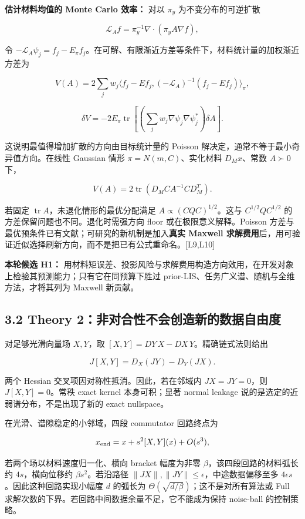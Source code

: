 \documentclass[
  11pt,
  a4paper,
]{article}
\begin{document}
\textbf{估计材料均值的 Monte Carlo 效率：} 对以 \(\pi_y\)
为不变分布的可逆扩散

\[\mathcal{L}_A f=\pi_y^{-1}\nabla\cdot(\pi_y A\nabla f),\]

令
\(-\mathcal{L}_A\psi_j=f_j-E_\pi f_j\)。在可解、有限渐近方差等条件下，材料统计量的加权渐近方差为

\[V(A)=2\sum_j w_j\langle f_j-Ef_j,(-\mathcal{L}_A)^{-1}(f_j-Ef_j)\rangle_\pi,\]

\[\delta V=-2E_\pi\operatorname{tr}\left[\left(\sum_jw_j\nabla\psi_j\nabla\psi_j^*\right)\delta A\right].\]

这说明最值得增加扩散的方向由目标统计量的 Poisson
解决定，通常不等于最小奇异值方向。在线性 Gaussian 情形
\(\pi=N(m,C)\)、实化材料 \(D_Mx\)、常数 \(A\succ0\) 下，

\[V(A)=2\operatorname{tr}(D_MCA^{-1}CD_M^T).\]

若固定 \(\operatorname{tr}A\)，未退化情形的最优分配满足
\(A\propto(CQC)^{1/2}\)。这与 \(C^{1/2}QC^{1/2}\)
的方差保留问题也不同。退化时需强方向 floor 或在极限意义解释。Poisson
方差与最优预条件已有文献；可研究的新机制是加入\textbf{真实 Maxwell
求解费用}后，用可验证近似选择刷新方向，而不是把已有公式重命名。{[}L9,L10{]}

\textbf{本轮候选 H1：}
用材料矩误差、投影风险与求解费用构造方向效用，在开发对象上检验其预测能力；只有它在同预算下胜过
prior-LIS、任务广义谱、随机与全维方法，才将其列为 Maxwell 新贡献。

\hypertarget{theory-2ux975eux5bf9ux5408ux6027ux4e0dux4f1aux521bux9020ux65b0ux7684ux6570ux636eux81eaux7531ux5ea6}{%
\subsection{3.2 Theory
2：非对合性不会创造新的数据自由度}\label{theory-2ux975eux5bf9ux5408ux6027ux4e0dux4f1aux521bux9020ux65b0ux7684ux6570ux636eux81eaux7531ux5ea6}}

对足够光滑向量场 \(X,Y\)，取 \([X,Y]=DY\,X-DX\,Y\)。精确链式法则给出

\[J[X,Y]=D_X(JY)-D_Y(JX).\]

两个 Hessian 交叉项因对称性抵消。因此，若在邻域内 \(JX=JY=0\)，则
\(J[X,Y]=0\)。常秩 exact kernel 本身可积；显著 normal leakage
说的是选定的近弱谱分布，不是出现了新的 exact nullspace。

在光滑、谱隙稳定的小邻域，四段 commutator 回路终点为

\[x_{\rm end}=x+s^2[X,Y](x)+O(s^3),\]

若两个场以材料速度归一化、横向 bracket 幅度为非零
\(\beta\)，该四段回路的材料弧长约 \(4s\)，横向位移约
\(\beta s^2\)。若沿路径 \(\|JX\|,\|JY\|\le\epsilon\)，中途数据偏移至多
\(4\epsilon s\)。因此这种回路实现小幅度 \(d\) 的弧长为
\(\Theta(\sqrt{d/\beta})\)；这不是对所有算法或 Full
求解次数的下界。若回路中间数据余量不足，它不能成为保持 noise-ball
的控制策略。
\end{document}
